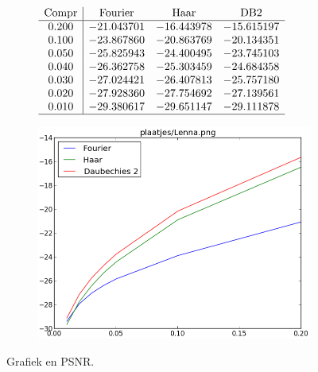 \begin{figure}
  \centering
  \begin{subfigure}[t]{0.48\textwidth}
    \centering
    \vspace{10pt}
    \begingroup

    \renewcommand*{\arraystretch}{1.5}
    $\begin{array}{c | c c c c}
      \text{Compr} & \text{Fourier} & \text{Haar} & \text{DB2} \\ \hline
      0.200 & -21.043701 & -16.443978 & -15.615197 \\
      0.100 & -23.867860 & -20.863769 & -20.134351 \\
      0.050 & -25.825943 & -24.400495 & -23.745103 \\
      0.040 & -26.362758 & -25.303459 & -24.684358 \\
      0.030 & -27.024421 & -26.407813 & -25.757180 \\
      0.020 & -27.928360 & -27.754692 & -27.139561 \\
      0.010 & -29.380617 & -29.651147 & -29.111878 \\ \hline
    \end{array}$
    \endgroup
  \end{subfigure}
  \begin{subfigure}[t]{0.48\textwidth}
    \centering
    \vspace{0pt}
    \includegraphics[height=\textwidth]{plaatjes/grafiek_Lenna_0_15-0_01.png}
  \end{subfigure}
  \caption{Grafiek en PSNR.}
\end{figure}
\restoregeometry
\pagebreak

